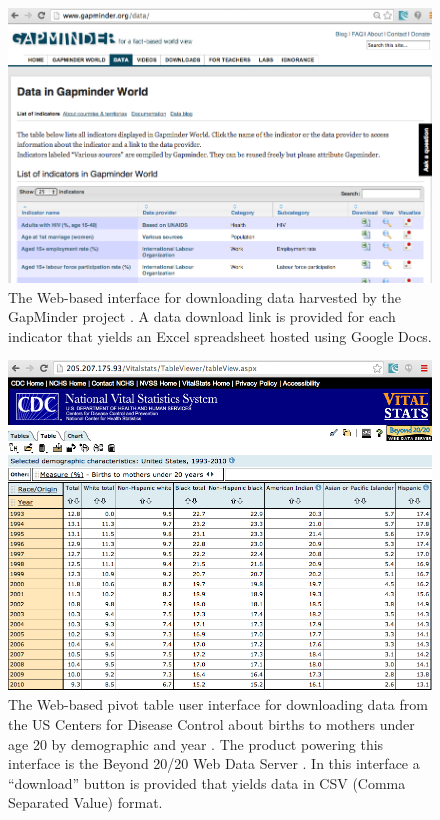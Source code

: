 \documentclass[12pt]{article}
\begin{document}
\begin{doublespace}
\begin{figure}[h!]
  \centering
  \includegraphics[width=\textwidth]{figures/gapminderData.png}
  \caption[GapMinder Data Access User Interface.]
    {The Web-based interface for downloading data harvested by the GapMinder project \cite{gapminderData}. A data download link is provided for each indicator that yields an Excel spreadsheet hosted using Google Docs.}
  \label{fig:gapminderData}
\end{figure}

\begin{figure}[h!]
  \centering
  \includegraphics[width=\textwidth]{figures/CDCVitalStatsUI.png}
  \caption[CDC Vital Statistics.]
    {The Web-based pivot table user interface for downloading data from the US Centers for Disease Control about births to mothers under age 20 by demographic and year \cite{CDCVitalStatsUI}. The product powering this interface is the Beyond 20/20 Web Data Server \cite{beyond2020webDataServer}. In this interface a ``download'' button is provided that yields data in CSV (Comma Separated Value) format.}
  \label{fig:CDCVitalStatsUI}
\end{figure}


\end{doublespace}
\end{document}
